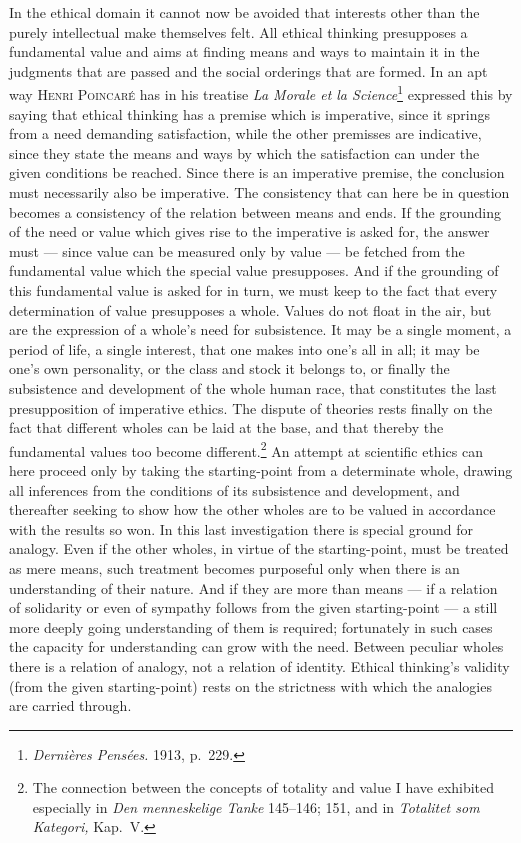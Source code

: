 \documentclass[12pt]{book}
\newcommand{\opage}[1]{\marginnote{\footnotesize\textit{[#1]}}}
\begin{document}
In the ethical domain it cannot now be avoided that interests other than the
purely intellectual make themselves felt. All ethical thinking presupposes a
fundamental value and aims at finding means and ways to maintain it in the
judgments that are passed and the social orderings that are formed. In an apt way
\textsc{Henri Poincaré} has in his treatise \textit{La Morale et la
Science}\footnote{\textit{Dernières Pensées.} 1913, p.\ 229.} expressed this by
saying that ethical thinking has a premise which is imperative, since it springs
from a need demanding satisfaction, while the other premisses are indicative,
since they state the means and ways by which the satisfaction can under the given
conditions be reached. Since there is an imperative premise, the conclusion must
necessarily also be imperative. The consistency that can here be in question
becomes a consistency of the relation between means and ends. If the grounding of
the need or value which gives rise to the imperative is asked for, the answer
must --- since value can be measured only by value --- be fetched from the
fundamental value which the special value presupposes. And if the grounding of
this fundamental value is asked for in turn, we must keep to the fact that every
determination of value presupposes a whole. Values do not float in the air, but
are the expression of a whole's need for subsistence. It may be a single moment,
a period of life, a single interest, that one makes into one's all in all; it may
be one's own personality, or the class and stock it belongs to, or finally the
subsistence and development of the whole human race, that constitutes the last
presupposition of \opage{122}imperative ethics. The dispute of theories rests finally on the
fact that different wholes can be laid at the base, and that thereby the
fundamental values too become different.\footnote{The connection between the
concepts of totality and value I have exhibited especially in \textit{Den
menneskelige Tanke} 145--146; 151, and in \textit{Totalitet som Kategori,}
Kap.\ V.} An attempt at scientific ethics can here proceed only by taking the
starting-point from a determinate whole, drawing all inferences from the
conditions of its subsistence and development, and thereafter seeking to show how
the other wholes are to be valued in accordance with the results so won. In this
last investigation there is special ground for analogy. Even if the other wholes,
in virtue of the starting-point, must be treated as mere means, such treatment
becomes purposeful only when there is an understanding of their nature. And if
they are more than means --- if a relation of solidarity or even of sympathy
follows from the given starting-point --- a still more deeply going understanding
of them is required; fortunately in such cases the capacity for understanding can
grow with the need. Between peculiar wholes there is a relation of analogy, not a
relation of identity. Ethical thinking's validity (from the given starting-point)
rests on the strictness with which the analogies are carried through.
\end{document}
